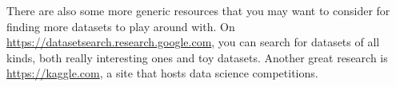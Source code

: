 


There are also some more generic resources that you may want to consider for finding
more datasets to play around with. On  \url{https://datasetsearch.research.google.com},
you can search for datasets of all kinds, both really interesting ones and toy datasets.
Another great research is \url{https://kaggle.com}, a site that hosts data
science competitions.




